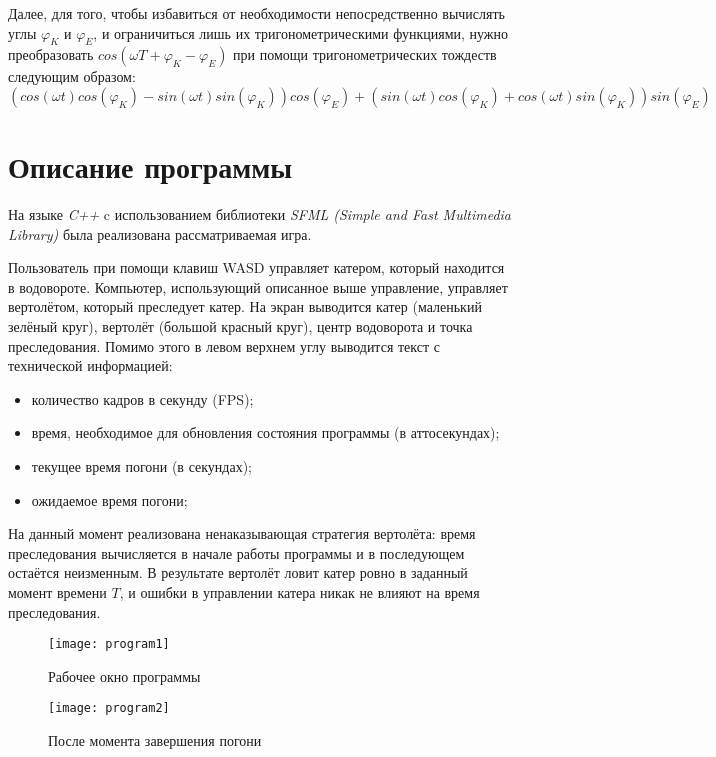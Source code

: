 \documentclass[12pt,a4paper,titlepage]{article}
\begin{document}
    Далее, для того, чтобы избавиться от необходимости непосредственно вычислять углы $\varphi_K$ и $\varphi_E$,
    и ограничиться лишь их тригонометрическими функциями, нужно преобразовать $cos(\omega T + \varphi_K - \varphi_E)$
    при помощи тригонометрических тождеств следующим образом:
    $$
      (cos(\omega t)cos(\varphi_K) - sin(\omega t)sin(\varphi_K))cos(\varphi_E) +
      (sin(\omega t)cos(\varphi_K) + cos(\omega t)sin(\varphi_K))sin(\varphi_E)
    $$


\section{Описание программы}
  \par
  На языке \textit{C++} c использованием библиотеки \textit{SFML (Simple and Fast Multimedia Library)}
  была реализована рассматриваемая игра.
  
  \par
  Пользователь при помощи клавиш WASD управляет катером, который находится в водовороте.
  Компьютер, использующий описанное выше управление, управляет вертолётом, который преследует катер.
  На экран выводится катер (маленький зелёный круг), вертолёт (большой красный круг), центр водоворота и точка преследования.
  Помимо этого в левом верхнем углу выводится текст с технической информацией:
  \begin{itemize}
    \item количество кадров в секунду (FPS);
    \item время, необходимое для обновления состояния программы (в аттосекундах);
    \item текущее время погони (в секундах);
    \item ожидаемое время погони;
  \end{itemize}
  
  На данный момент реализована ненаказывающая стратегия вертолёта: время преследования вычисляется в начале работы программы
  и в последующем остаётся неизменным.
  В результате вертолёт ловит катер ровно в заданный момент времени $T$, и ошибки в управлении катера никак не влияют
  на время преследования.
  \begin{figure}
    \begin{center}
      \texttt{[image: program1]}
      \caption{Рабочее окно программы}
    \end{center}
  \end{figure}
  \begin{figure}
    \begin{center}
      \texttt{[image: program2]}
      \caption{После момента завершения погони}
    \end{center}
  \end{figure}
  
\end{document}
